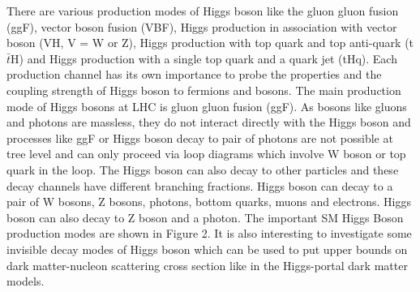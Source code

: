 \documentclass[final,3p]{CSP}
\begin{document}

There are various production modes of Higgs boson like the gluon gluon fusion (ggF), vector boson fusion (VBF), Higgs 
production in association with vector boson (VH, V = W or Z), Higgs production with top quark and top anti-quark (t$\bar{t}$H) and Higgs 
production with a single top quark and a quark jet (tHq). Each production channel has its own importance to probe the 
properties and the coupling strength of Higgs boson to fermions and bosons. The main production mode of Higgs bosons at LHC is 
gluon gluon fusion (ggF). As bosons like gluons and photons are massless, they do not interact directly with the Higgs boson 
and processes like ggF or Higgs boson decay to pair of photons are not possible at tree level and can only proceed via loop 
diagrams which involve W boson or top quark in the loop. The Higgs boson can also decay to other particles and these decay 
channels have different branching fractions. Higgs boson can decay to a pair of W bosons, Z bosons, photons, bottom quarks, 
muons and electrons. Higgs boson can also decay to Z boson and a photon. The important SM Higgs Boson production modes are shown in Figure 2. It is also interesting to investigate some invisible 
decay modes of Higgs boson which can be used to put upper bounds on dark matter-nucleon scattering cross section like in the 
Higgs-portal dark matter models.

\end{document}
